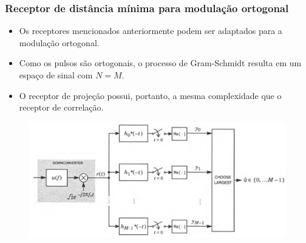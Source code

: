 \begin{frame}
	\frametitle{Receptor de distância mínima para modulação ortogonal}

	\begin{itemize}
	    \item Os receptores mencionados anteriormente podem ser adaptados para a modulação ortogonal.
	    \item Como os pulsos são ortogonais, o processo de Gram-Schmidt resulta em um espaço de sinal com $N=M$.    
	    \item O receptor de projeção possui, portanto, a mesma complexidade que o receptor de correlação.
	\end{itemize}
	\begin{figure}[t]	
	    \begin{center}
	    \includegraphics[width=0.7\columnwidth]{figs/adv_07}
	    \end{center}
	\end{figure}
\end{frame}

